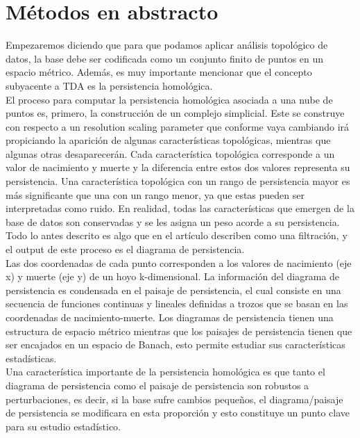\documentclass{article}
\begin{document}
\maketitle

\section{Métodos en abstracto}

Empezaremos diciendo que para que podamos aplicar análisis topológico de datos, la base debe ser codificada como un conjunto finito de puntos en un espacio métrico. Además, es muy importante mencionar que el concepto subyacente a TDA es la persistencia homológica.\\

El proceso para computar la persistencia homológica asociada a una nube de puntos es, primero, la construcción de un complejo simplicial. Este se construye con respecto a un resolution scaling parameter que conforme vaya cambiando irá propiciando la aparición de algunas características topológicas, mientras que algunas otras desaparecerán. Cada característica topológica corresponde a un valor de nacimiento y muerte y la diferencia entre estos dos valores representa su persistencia. Una característica topológica con un rango de persistencia mayor es más significante que una con un rango menor, ya que estas pueden ser interpretadas como ruido. En realidad, todas las características que emergen de la base de datos son conservadas y se les asigna un peso acorde a su persistencia. Todo lo antes descrito es algo que en el artículo describen como una filtración, y el output de este proceso es el diagrama de persistencia.\\

Las dos coordenadas de cada punto corresponden a los valores de nacimiento (eje x) y muerte (eje y) de un hoyo k-dimensional. La información del diagrama de persistencia es condensada en el paisaje de persistencia, el cual consiste en una secuencia de funciones continuas y lineales definidas a trozos que se basan en las coordenadas de nacimiento-muerte. Los diagramas de persistencia tienen una estructura de espacio métrico mientras que los paisajes de persistencia tienen que ser encajados en un espacio de Banach, esto permite estudiar sus características estadísticas.\\

Una característica importante de la persistencia homológica es que tanto el diagrama de persistencia como el paisaje de persistencia son robustos a perturbaciones, es decir, si la base sufre cambios pequeños, el diagrama/paisaje de persistencia se modificara en esta proporción y esto constituye un punto clave para su estudio estadístico. 
\end{document}
